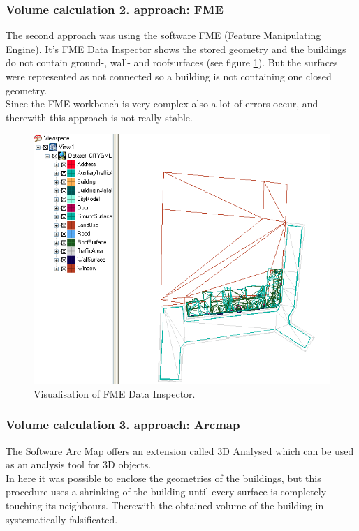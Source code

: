 \subsubsection{Volume calculation 2. approach: FME}
The second approach was using the software FME (Feature Manipulating Engine). It’s FME Data Inspector shows the stored geometry and the buildings do not contain ground-, wall- and roofsurfaces (see figure \ref{fig:fme}). But the surfaces were represented as not connected so a building is not containing one closed geometry.\\
Since the FME workbench is very complex also a lot of errors occur, and therewith this approach is not really stable.
\begin{figure}[h]
	\centering
 	 \includegraphics[scale=0.3]{phase1/group1/fme.png} 
	\caption{Visualisation of FME Data Inspector.}
	\label{fig:fme}
\end{figure}

\subsubsection{Volume calculation 3. approach: Arcmap}
The Software Arc Map offers an extension called 3D Analysed which can be used as an analysis tool for 3D objects.\\
In here it was possible to enclose the geometries of the buildings, but this procedure uses a shrinking of the building until every surface is completely touching its neighbours. Therewith the obtained volume of the building in systematically falsificated.

